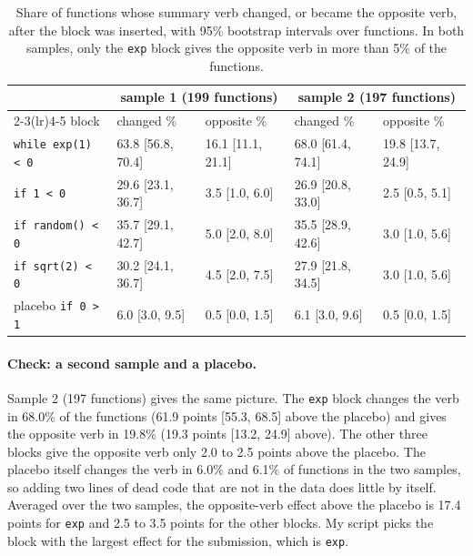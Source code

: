 \documentclass{article}
\newcommand{\code}[1]{\texttt{#1}}
\begin{document}
\begin{table}[ht]
\centering
\caption{Share of functions whose summary verb changed, or became the opposite verb, after the block
was inserted, with 95\% bootstrap intervals over functions. In both samples, only the \code{exp} block
gives the opposite verb in more than 5\% of the functions.}
\label{tab:inject}
\footnotesize
\setlength{\tabcolsep}{4pt}
\begin{tabular}{lllll}
\toprule
& \multicolumn{2}{c}{sample 1 (199 functions)} & \multicolumn{2}{c}{sample 2 (197 functions)} \\
\cmidrule(lr){2-3}\cmidrule(lr){4-5}
block & changed \% & opposite \% & changed \% & opposite \% \\
\midrule
\code{while exp(1) < 0}  & 63.8 [56.8, 70.4] & 16.1 [11.1, 21.1] & 68.0 [61.4, 74.1] & 19.8 [13.7, 24.9] \\
\code{if 1 < 0}          & 29.6 [23.1, 36.7] & 3.5 [1.0, 6.0]    & 26.9 [20.8, 33.0] & 2.5 [0.5, 5.1] \\
\code{if random() < 0}   & 35.7 [29.1, 42.7] & 5.0 [2.0, 8.0]    & 35.5 [28.9, 42.6] & 3.0 [1.0, 5.6] \\
\code{if sqrt(2) < 0}    & 30.2 [24.1, 36.7] & 4.5 [2.0, 7.5]    & 27.9 [21.8, 34.5] & 3.0 [1.0, 5.6] \\
placebo \code{if 0 > 1}  & 6.0 [3.0, 9.5]    & 0.5 [0.0, 1.5]    & 6.1 [3.0, 9.6]    & 0.5 [0.0, 1.5] \\
\bottomrule
\end{tabular}
\end{table}

\paragraph{Check: a second sample and a placebo.} Sample 2 (197 functions) gives the same picture. The
\code{exp} block changes the verb in 68.0\% of the functions (61.9 points [55.3, 68.5] above the
placebo) and gives the opposite verb in 19.8\% (19.3 points [13.2, 24.9] above). The other three
blocks give the opposite verb only 2.0 to 2.5 points above the placebo. The placebo itself changes the
verb in 6.0\% and 6.1\% of functions in the two samples, so adding two lines of dead code that are not
in the data does little by itself. Averaged over the two samples, the opposite-verb effect above the
placebo is 17.4 points for \code{exp} and 2.5 to 3.5 points for the other blocks. My script picks the
block with the largest effect for the submission, which is \code{exp}.
\end{document}
